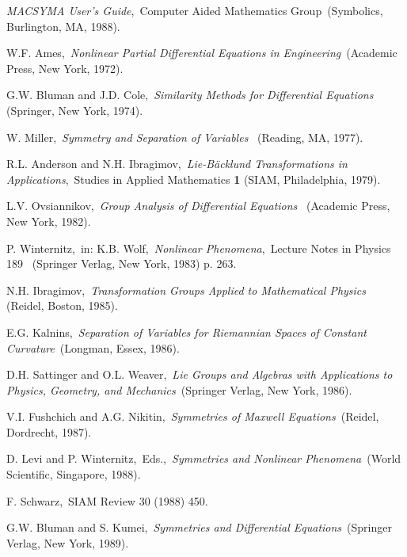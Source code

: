 {\begin{thebibliography}{99}
 {\em MACSYMA User's Guide},\,
Computer Aided Mathematics Group\, (Symbolics, Burlington, MA, 1988).

 {\sc W.F. Ames},\, {\em  Nonlinear Partial Differential
Equations in Engineering}\, (Academic Press, New York, 1972).

 {\sc G.W. Bluman} and {\sc J.D. Cole},\, 
{\em Similarity Methods for Differential Equations} \,
(Springer, New York, 1974).

 {\sc W. Miller},\, {\em Symmetry and Separation of
Variables} \, (Reading, MA, 1977).

 {\sc R.L. Anderson} and {\sc N.H. Ibragimov},\,
{\em Lie-B\"{a}cklund Transformations in Applications},\, Studies in 
Applied Mathematics {\bf 1} (SIAM, Philadelphia, 1979).

 {\sc L.V. Ovsiannikov},\, {\em Group Analysis of 
Differential Equations} \, (Academic Press, New York, 1982).

 {\sc P. Winternitz},\, 
in: K.B. Wolf,\, {\em Nonlinear Phenomena},\, Lecture Notes in Physics 189 \, 
(Springer Verlag, New York, 1983) p. 263.

 {\sc N.H. Ibragimov},\, {\em Transformation
Groups Applied to Mathematical Physics} \, (Reidel, Boston, 1985).

 {\sc E.G. Kalnins},\, {\em Separation of Variables for
Riemannian Spaces of Constant Curvature}\, 
(Longman, Essex, 1986).

 {\sc D.H. Sattinger} and {\sc O.L. Weaver},\,
{\em Lie Groups and Algebras with Applications to Physics, Geometry, and
Mechanics}\, (Springer Verlag, New York, 1986).

 {\sc V.I. Fushchich} and {\sc A.G. Nikitin},\, 
{\em Symmetries of Maxwell Equations}\,
(Reidel, Dordrecht, 1987).

 {\sc D. Levi} and {\sc P. Winternitz},\, Eds.,\,
{\em  Symmetries and Nonlinear Phenomena}\,
(World Scientific, Singapore, 1988).

\newpage

 {\sc F. Schwarz},\, 
SIAM Review 30 (1988) 450.

{\sc G.W. Bluman} and {\sc S. Kumei},\, 
{\em Symmetries and Differential Equations}\,
(Springer Verlag, New York, 1989).


\end{thebibliography}}
